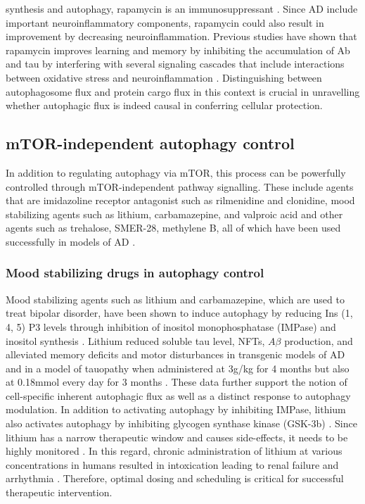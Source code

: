 synthesis and autophagy, rapamycin is an immunosuppressant \citep{Khanna2000,Mohacsi1992,Wicker1990}. Since AD include important neuroinflammatory components, rapamycin could also result in improvement by decreasing neuroinflammation. Previous studies have shown that rapamycin improves learning and memory by inhibiting the accumulation of Ab and tau by interfering with several signaling cascades \citep{Liu2013,Liu2013a,Maiese2012} that include interactions between oxidative stress and neuroinflammation \citep{Agostinho2010,Galimberti2011}. Distinguishing between autophagosome flux and protein cargo flux in this context is crucial in unravelling whether autophagic flux is indeed causal in conferring cellular protection. 

\subsection{mTOR-independent autophagy control}
In addition to regulating autophagy via mTOR, this process can be powerfully controlled through mTOR-independent pathway signalling. These include agents that are imidazoline receptor antagonist such as rilmenidine and clonidine, mood stabilizing agents such as lithium, carbamazepine, and valproic acid and other agents such as trehalose, SMER-28, methylene B, all of which have been used successfully in models of AD \citep{Congdon2012,Medina2011,Perucho2012,Schaeffer2012,Shimada2012,Tian2011,Zhang2011}.

\subsubsection{Mood stabilizing drugs in autophagy control}
Mood stabilizing agents such as lithium and carbamazepine, which are used to treat bipolar disorder, have been shown to induce autophagy by reducing Ins (1, 4, 5) P3 levels through inhibition of inositol monophosphatase (IMPase) and inositol synthesis \citep{Frake2015,sarkar2013}. Lithium reduced soluble tau level, NFTs, $A\beta$ production, and alleviated memory deficits and motor disturbances in transgenic models of AD and in a model of tauopathy when administered at 3g/kg for 4 months \citep{Shimada2012} but also at 0.18mmol every day for 3 months \citep{Zhang2011}. These data further support the notion of cell-specific inherent autophagic flux as well as a distinct response to autophagy modulation. In addition to activating autophagy by inhibiting IMPase, lithium also activates autophagy by inhibiting glycogen synthase kinase (GSK-3b) \citep{Gonzalez-Polo2015,sarkar2013,Sarkar2007}. Since lithium has a narrow therapeutic window and causes side-effects, it needs to be highly monitored \citep{Gonzalez-Polo2015}. In this regard, chronic administration of lithium at various concentrations in humans resulted in intoxication leading to renal failure and arrhythmia \citep{Chan2012,Gonzalez-Polo2015,Menegueti2012,Rej2012}. Therefore, optimal dosing and scheduling is critical for successful therapeutic intervention. 

